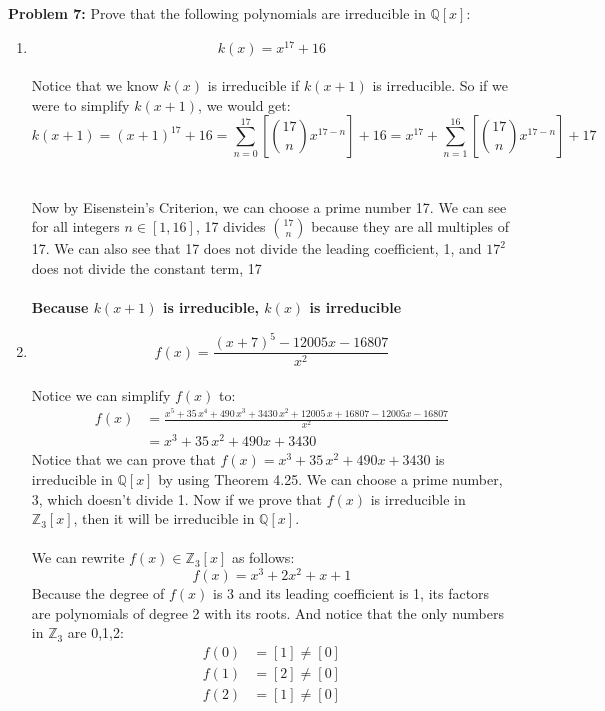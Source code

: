 \documentclass[12pt]{article}
\begin{document}
\newpage

\noindent \textbf{Problem 7: }Prove that the following polynomials are irreducible in $\mathbb{Q}[x]$:
	\begin{enumerate}[label = (\alph*)]
		\item $$k(x) = x^{17} + 16$$
		\\
		Notice that we know $k(x)$ is irreducible if $k(x+1)$ is irreducible. So if we were to simplify $k(x+1)$, we would get:
			$$
			k(x+1) = (x+1)^{17} + 16 = \sum_{n=0}^{17} \left[\binom{17}{n} x^{17-n}\right] + 16 = x^{17} + \sum_{n=1}^{16}\left[\binom{17}{n} x^{17-n}\right] + 17
			$$
		\\ \\
		Now by Eisenstein's Criterion, we can choose a prime number 17.  We can see for all integers $n \in [1,16]$, 17 divides $\binom{17}{n}$ because they are all multiples of 17.  We can also see that 17 does not divide the leading coefficient, 1, and $17^2$ does not divide the constant term, 17
		\\ \\
		\textbf{\boldmath Because $k(x+1)$ is irreducible, $k(x)$ is irreducible} 
		\\ 
		\item $$f(x) = \frac{(x+7)^5 - 12005x - 16807}{x^2}$$
		\\
		Notice we can simplify $f(x)$ to:
			\begin{align*}
				f(x) &= \frac{x^5+35\,x^4+490\,x^3+3430\,x^2+12005\,x+16807 - 12005x - 16807}{x^2} \\
				&= x^3+35\,x^2+490x+3430
			\end{align*}
		Notice that we can prove that $f(x) = x^3+35\,x^2+490x+3430$ is irreducible in $\mathbb{Q}[x]$ by using Theorem 4.25.  We can choose a prime number, 3, which doesn't divide 1. Now if we prove that $f(x)$ is irreducible in $\mathbb{Z}_3[x]$, then it will be irreducible in $\mathbb{Q}[x]$.
		\\ \\
		We can rewrite $f(x) \in \mathbb{Z}_3[x]$ as follows:
			$$
			f(x) = x^3 + 2x^2 + x + 1
			$$
		Because the degree of $f(x)$ is 3 and its leading coefficient is 1, its factors are polynomials of degree 2 with its roots. And notice that the only numbers in $\mathbb{Z}_3$ are 0,1,2:
		\begin{align*}
		f(0) &= [1] \not = [0] \\
		f(1) &= [2] \not = [0] \\
		f(2) &= [1] \not = [0]
		\end{align*}

\end{enumerate}
\end{document}
